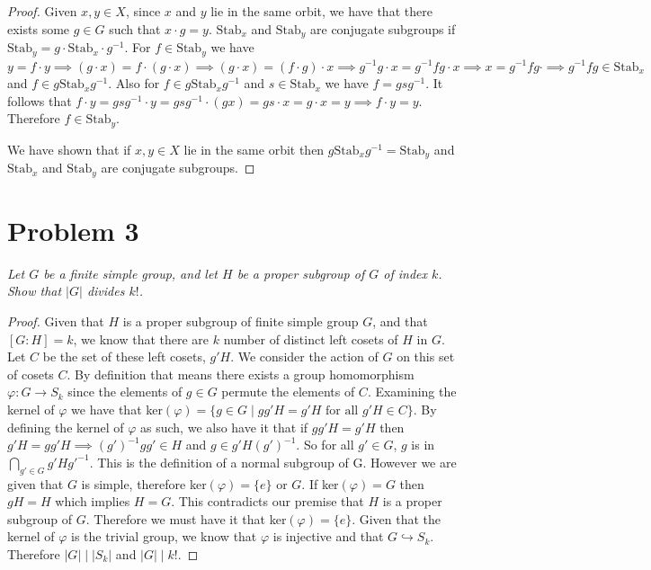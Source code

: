 \documentclass{article}
\theoremstyle{plain} %
\theoremstyle{definition} %
\begin{document}
\begin{proof}
    Given $x,y \in X$, since $x$ and $y$ lie in the same orbit, we have that
    there exists some $g \in G$ such that $x\cdot g = y$. $\text{Stab}_x$ and
    $\text{Stab}_y$ are conjugate subgroups if $\text{Stab}_y = g \cdot \text{Stab}_x \cdot g^{-1}$.  
    For $f \in \text{Stab}_y$ we have $y = f \cdot y \implies (g \cdot x) = f \cdot (g \cdot x) \implies (g \cdot x) =  (f \cdot g) \cdot x
    \implies g^{-1}g \cdot x = g^{-1}fg \cdot x \implies x = g^{-1}fg \cdot \implies g^{-1}fg \in \text{Stab}_x$ and
    $f \in g\text{Stab}_xg^{-1}$.
    Also for $f \in g\text{Stab}_xg^{-1}$ and $s \in  \text{Stab}_x$ we have $f = gsg^{-1}$.
    It follows that $f \cdot y = gsg^{-1} \cdot y = gsg^{-1} \cdot (gx) = gs \cdot x = g \cdot x = y \implies f \cdot y = y$. Therefore $f \in \text{Stab}_y$.

    We have shown that if $x,y \in X$ lie in the same orbit then $g\text{Stab}_xg^{-1} = \text{Stab}_y$ and $\text{Stab}_x$ and
    $\text{Stab}_y$ are conjugate subgroups.
\end{proof}

\section*{Problem 3}
\noindent \textit{Let $G$ be a finite simple group, and let $H$ be a proper subgroup
of $G$ of index $k$. Show that $|G|$ divides $k!$.}

\begin{proof}
    Given that $H$ is a proper subgroup of finite simple group $G$, and that $[G:H]=k$, we know that there
    are $k$ number of distinct left cosets of $H$ in $G$. Let $C$ be the set of these left cosets, $g'H$.
    We consider the action of $G$ on this set of cosets $C$. By definition
    that means there exists a group homomorphism $\varphi: G \to S_k$ since
    the elements of $g \in G$ permute the elements of $C$. Examining the kernel of $\varphi$ we
    have that ker$(\varphi)=\{g \in G \mid gg'H = g'H \text{ for all } g'H \in C \}$. By
    defining the kernel of $\varphi$ as such, we also have it that if $gg'H = g'H$ then
    $g'H = gg'H \implies (g')^{-1}gg' \in H$ and $g \in g'H(g')^{-1}$. So for all
    $g' \in G$, $g$ is in $\bigcap\limits_{g' \in G} g'Hg'^{-1}$. This is the definition of
    a normal subgroup of G. However we are given that $G$ is simple, therefore
    ker$(\varphi) = \{ e \}$ or $G$. If ker$(\varphi) = G$ then $gH = H$ which
    implies $H=G$. This contradicts our premise that $H$ is a proper subgroup of $G$.
    Therefore we must have it that ker$(\varphi) = \{ e\}$. Given that the kernel of $\varphi$
    is the trivial group, we know that $\varphi$ is injective and that $G \hookrightarrow S_k$.
    Therefore $|G| \mid |S_k|$ and $|G| \mid k!$.
\end{proof}
\end{document}
